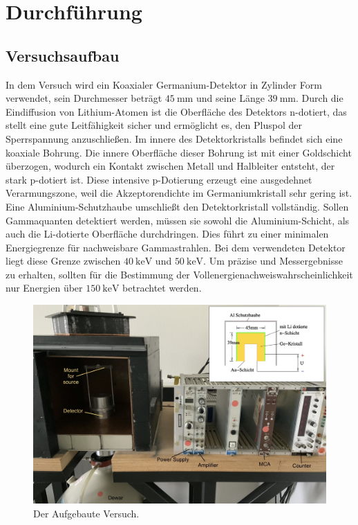 \section{Durchführung}
\label{sec:Durchführung und Aufbau }
\subsection{Versuchsaufbau}

In dem Versuch wird ein Koaxialer Germanium-Detektor in Zylinder Form verwendet, sein Durchmesser beträgt $\qty{45}{\milli\meter}$ und
seine Länge $\qty{39}{\milli\meter}$. Durch die Eindiffusion von Lithium-Atomen ist die Oberfläche des Detektors n-dotiert, das stellt
eine gute Leitfähigkeit sicher und ermöglicht es, den Pluspol der Sperrspannung anzuschließen.
Im innere des Detektorkristalls befindet sich eine koaxiale Bohrung. Die innere Oberfläche dieser Bohrung ist mit einer 
Goldschicht überzogen, wodurch ein Kontakt zwischen Metall und Halbleiter entsteht, der stark p-dotiert ist. Diese 
intensive p-Dotierung erzeugt eine ausgedehnet Verarmungszone, weil die Akzeptorendichte im Germaniumkristall sehr gering ist.
Eine Aluminium-Schutzhaube umschließt den Detektorkristall vollständig. Sollen Gammaquanten detektiert werden, müssen sie sowohl 
die Aluminium-Schicht, als auch die Li-dotierte Oberfläche durchdringen. Dies führt zu einer minimalen Energiegrenze für nachweisbare
Gammastrahlen. Bei dem verwendeten Detektor liegt diese Grenze zwischen $\qty{40}{\kilo\electronvolt}$ und $\qty{50}{\kilo\electronvolt}$. Um präzise und Messergebnisse zu erhalten, 
sollten für die Bestimmung der Vollenergienachweiswahrscheinlichkeit nur Energien über $\qty{150}{\kilo\electronvolt}$ betrachtet werden.


\begin{figure}
    \includegraphics[width=\textwidth]{bilder/aufbau.jpg}
    \caption{Der Aufgebaute Versuch.}
\end{figure}

